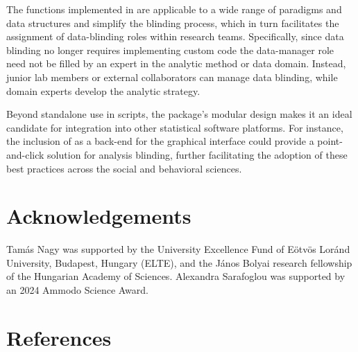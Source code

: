 The functions implemented in  are applicable to a wide range of paradigms and data structures and simplify the blinding process, which in turn facilitates the assignment of data-blinding roles within research teams. Specifically, since data blinding no longer requires implementing custom code the data-manager role need not be filled by an expert in the analytic method or data domain. Instead, junior lab members or external collaborators can manage data blinding, while domain experts develop the analytic strategy.

Beyond standalone use in  scripts, the package's modular design makes it an ideal candidate for integration into other statistical software platforms. For instance, the inclusion of  as a back-end for the  \citep{JASP2025} graphical interface could provide a point-and-click solution for analysis blinding, further facilitating the adoption of these best practices across the social and behavioral sciences.

\section{Acknowledgements}\label{acknowledgements}

Tamás Nagy was supported by the University Excellence Fund of Eötvös Loránd University, Budapest, Hungary (ELTE), and the János Bolyai research fellowship of the Hungarian Academy of Sciences. Alexandra Sarafoglou was supported by an 2024 Ammodo Science Award.

\section{References}\label{references}



\address{%
Tamás Nagy\\
ELTE Eötvös Loránd University\\%
Institute of Psychology, ELTE Eötvös Loránd University\\ Budapest, Hungary\\
%
%
\textit{ORCiD: \href{https://orcid.org/0000-0001-5244-0356}{0000-0001-5244-0356}}\\%
\href{mailto:nagy.tamas@ppk.elte.hu}{\nolinkurl{nagy.tamas@ppk.elte.hu}}%
}

\address{%
Márton Kovács\\
Independent researcher\\%
Budapest, Hungary\\
%
%
\textit{ORCiD: \href{https://orcid.org/0000-0002-8142-8492}{0000-0002-8142-8492}}\\%
\href{mailto:marton.balazs.kovacs@gmail.com}{\nolinkurl{marton.balazs.kovacs@gmail.com}}%
}

